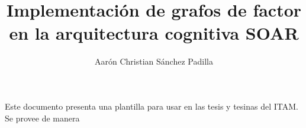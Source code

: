 \documentclass{tesisITAM}
\title{Implementaci\'{o}n de grafos de factor en la arquitectura cognitiva SOAR}
\author{Aarón Christian Sánchez Padilla}
\begin{document}
	\maketitle
	\publicationrights


		Este documento presenta una plantilla para usar en las tesis y tesinas del ITAM. Se provee de manera %



	\setcounter{page}{1}

	\tableofcontents
	\newpage

	\setcounter{page}{1}


	
	
	

	\appendix

	\clearpage
	
	{}
	
	
\end{document}
